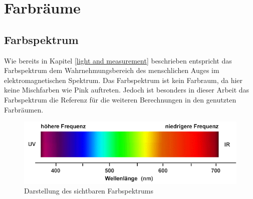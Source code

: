 \documentclass[11pt]{scrartcl}
\begin{document}
\section{Farbräume}
\subsection{Farbspektrum}
Wie bereits in Kapitel \ref{light and measurement} beschrieben entspricht das Farbspektrum dem Wahrnehmungsbereich des menschlichen
Auges im elektromagnetischen Spektrum. Das Farbspektrum ist kein Farbraum, da hier keine Mischfarben wie Pink auftreten. Jedoch ist
besonders in dieser Arbeit das Farbspektrum die Referenz für die weiteren Berechnungen in den genutzten Farbräumen.
\begin{figure}[H]
    \includegraphics[width=\textwidth]{images/farbspektrum.png}
    \caption[Darstellung des sichtbaren Farbspektrums]{Darstellung des sichtbaren Farbspektrums \cite{fhtEsslignen}}
\end{figure}
\noindent
\end{document}
